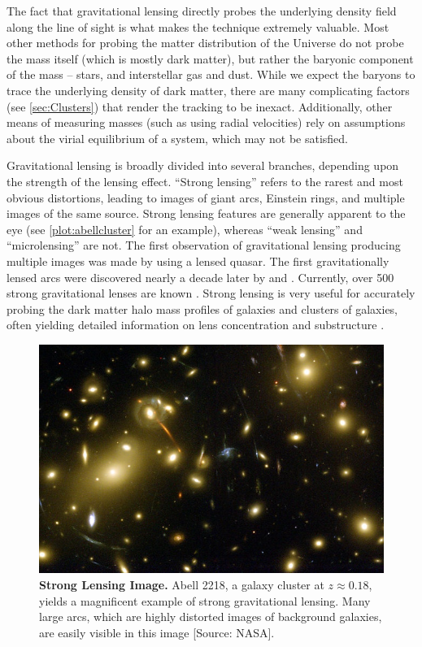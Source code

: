 The fact that gravitational lensing directly probes the underlying density field along the line of sight is what makes the technique extremely valuable. Most other methods for probing the matter distribution of the Universe do not probe the mass itself (which is mostly dark matter), but rather the baryonic component of the mass -- stars, and interstellar gas and dust. While we expect the baryons to trace the underlying density of dark matter, there are many complicating factors (see \autoref{sec:Clusters}) that render the tracking to be inexact. Additionally, other means of measuring masses (such as using radial velocities) rely on assumptions about the virial equilibrium of a system, which may not be satisfied.

Gravitational lensing is broadly divided into several branches, depending upon the strength of the lensing effect. ``Strong lensing'' refers to the rarest and most obvious distortions, leading to images of giant arcs, Einstein rings, and multiple images of the same source. Strong lensing features are generally apparent to the eye (see \autoref{plot:abellcluster} for an example), whereas ``weak lensing'' and ``microlensing'' are not. The first observation of gravitational lensing producing multiple images was made by \citet{Walsh79} using a lensed quasar. The first gravitationally lensed arcs were discovered nearly a decade later by \citet{Lynds86} and \citet{Soucail87,Soucail88}. Currently, over 500 strong gravitational lenses are known \citep{SpaceWarps15}. Strong lensing is very useful for accurately probing the dark matter halo mass profiles of galaxies and clusters of galaxies, often yielding detailed information on lens concentration \citep{Auger10} and substructure \citep{Mao98,Dalal02}. 

\begin{figure}
\begin{center}
\includegraphics[scale=1.5]{plots_intro/Abell2218_Med.jpg}
\caption[Strong Lensing Image]{{\bf Strong Lensing Image.} Abell 2218, a galaxy cluster at $z \approx 0.18$, yields a magnificent example of strong gravitational lensing. Many large arcs, which are highly distorted images of background galaxies, are easily visible in this image [Source: NASA].}
\label{plot:abellcluster}
\end{center}
\end{figure}

